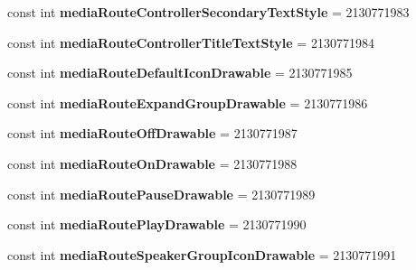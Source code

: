 \begin{DoxyCompactItemize}
\item 
\mbox{\label{classXaria_1_1Resource_1_1Attribute_a7266a82bd8412a2b3866305881ad7f08}} 
const int {\bfseries media\+Route\+Controller\+Secondary\+Text\+Style} = 2130771983
\item 
\mbox{\label{classXaria_1_1Resource_1_1Attribute_a7d07ceae0554eb1f604995dd7f05ffeb}} 
const int {\bfseries media\+Route\+Controller\+Title\+Text\+Style} = 2130771984
\item 
\mbox{\label{classXaria_1_1Resource_1_1Attribute_aec182f715c486fc1d28dfd824302ad67}} 
const int {\bfseries media\+Route\+Default\+Icon\+Drawable} = 2130771985
\item 
\mbox{\label{classXaria_1_1Resource_1_1Attribute_aedd85a4b146269b8827776d0e04850f6}} 
const int {\bfseries media\+Route\+Expand\+Group\+Drawable} = 2130771986
\item 
\mbox{\label{classXaria_1_1Resource_1_1Attribute_a87eaf92f40db322e03bcb718c428cf68}} 
const int {\bfseries media\+Route\+Off\+Drawable} = 2130771987
\item 
\mbox{\label{classXaria_1_1Resource_1_1Attribute_a97e4f201fdd14dbc8684096eab53b835}} 
const int {\bfseries media\+Route\+On\+Drawable} = 2130771988
\item 
\mbox{\label{classXaria_1_1Resource_1_1Attribute_a0f0369357797c799334305c47f530502}} 
const int {\bfseries media\+Route\+Pause\+Drawable} = 2130771989
\item 
\mbox{\label{classXaria_1_1Resource_1_1Attribute_a774f8ea98fed165e82e2775669ad2f6e}} 
const int {\bfseries media\+Route\+Play\+Drawable} = 2130771990
\item 
\mbox{\label{classXaria_1_1Resource_1_1Attribute_a35934bc886070ce8336771b3efbab2f9}} 
const int {\bfseries media\+Route\+Speaker\+Group\+Icon\+Drawable} = 2130771991
\item 

\end{DoxyCompactItemize}
